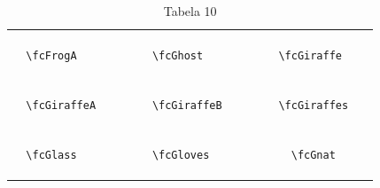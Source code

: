 \documentclass[x11names]{article}
\begin{document}
\begin{table}[H]
\begin{tabular}{|c|c|c|c|c|c|}
		&\multirow{5}{*}{	\fcFrogA	[scale=0.16]} & &\multirow{5}{*}{	\fcGhost	[scale=0.64]} & &\multirow{5}{*}{	\fcGiraffe	[scale=0.64]}\\	& & & & & \\	& & & & & \\	\verb|	\fcFrogA	| & & \verb|	\fcGhost	| & & \verb|	\fcGiraffe	| & \\	& & & & & \\	& & & & & \\	& & & & & \\	\hline									
		&\multirow{5}{*}{	\fcGiraffeA	[scale=0.64]} & &\multirow{5}{*}{	\fcGiraffeB	[scale=0.16]} & &\multirow{5}{*}{	\fcGiraffes	[scale=0.16]}\\	& & & & & \\	& & & & & \\	\verb|	\fcGiraffeA	| & & \verb|	\fcGiraffeB	| & & \verb|	\fcGiraffes	| & \\	& & & & & \\	& & & & & \\	& & & & & \\	\hline									
		&\multirow{5}{*}{	\fcGlass	[scale=0.64]} & &\multirow{5}{*}{	\fcGloves	[scale=0.04]} & &\multirow{5}{*}{	\fcGnat	[scale=0.64]}\\	& & & & & \\	& & & & & \\	\verb|	\fcGlass	| & & \verb|	\fcGloves	| & & \verb|	\fcGnat	| & \\	& & & & & \\	& & & & & \\	& & & & & \\		\hline 	\hline 	\end{tabular}	\caption{	Tabela 10	}\label{	Tab10	}\end{table}
\end{document}
